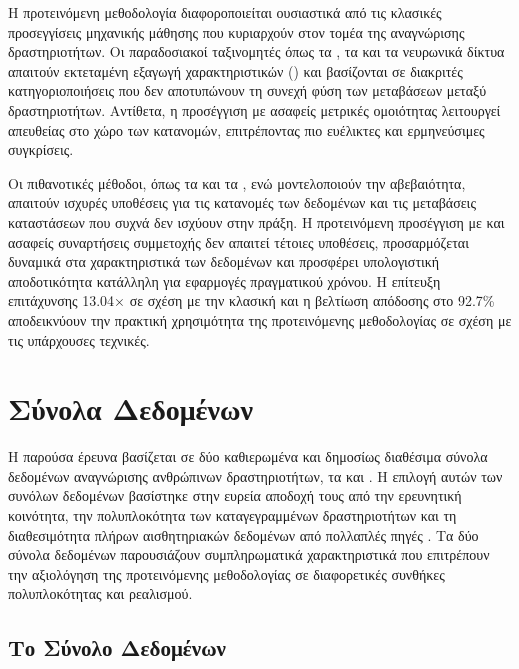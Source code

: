Η προτεινόμενη μεθοδολογία διαφοροποιείται ουσιαστικά από τις κλασικές προσεγγίσεις μηχανικής
μάθησης που κυριαρχούν στον τομέα της αναγνώρισης δραστηριοτήτων.
Οι παραδοσιακοί ταξινομητές όπως τα , τα  και τα νευρωνικά δίκτυα απαιτούν εκτεταμένη εξαγωγή χαρακτηριστικών () και βασίζονται σε διακριτές κατηγοριοποιήσεις που δεν αποτυπώνουν τη συνεχή
φύση των μεταβάσεων μεταξύ δραστηριοτήτων.
Αντίθετα, η προσέγγιση με ασαφείς μετρικές ομοιότητας λειτουργεί απευθείας στο χώρο των
κατανομών, επιτρέποντας πιο ευέλικτες και ερμηνεύσιμες συγκρίσεις.

Οι πιθανοτικές μέθοδοι, όπως τα  και τα , ενώ μοντελοποιούν την αβεβαιότητα, απαιτούν ισχυρές υποθέσεις για τις
κατανομές των δεδομένων και τις μεταβάσεις καταστάσεων που συχνά δεν ισχύουν στην πράξη.
Η προτεινόμενη προσέγγιση με  και ασαφείς συναρτήσεις συμμετοχής δεν απαιτεί
τέτοιες  υποθέσεις, προσαρμόζεται δυναμικά στα χαρακτηριστικά των δεδομένων και
προσφέρει υπολογιστική αποδοτικότητα κατάλληλη για εφαρμογές πραγματικού χρόνου.
Η επίτευξη επιτάχυνσης 13.04× σε σχέση με την κλασική  και η βελτίωση απόδοσης στο
92.7\%  αποδεικνύουν την πρακτική χρησιμότητα της προτεινόμενης μεθοδολογίας σε σχέση
με τις υπάρχουσες τεχνικές.


\section{Σύνολα Δεδομένων}
Η παρούσα έρευνα βασίζεται σε δύο καθιερωμένα και δημοσίως διαθέσιμα σύνολα δεδομένων αναγνώρισης ανθρώπινων δραστηριοτήτων, τα 
\cite{roggen2010,Chavarriaga2013} και  \cite{Reiss2012,Reiss2012creating}.
Η επιλογή αυτών των συνόλων δεδομένων βασίστηκε στην ευρεία αποδοχή τους από την ερευνητική κοινότητα, την πολυπλοκότητα των καταγεγραμμένων δραστηριοτήτων και τη διαθεσιμότητα πλήρων
αισθητηριακών δεδομένων από πολλαπλές πηγές \cite{Chen2012sensor}.
Τα δύο σύνολα δεδομένων παρουσιάζουν συμπληρωματικά χαρακτηριστικά που επιτρέπουν την αξιολόγηση της προτεινόμενης μεθοδολογίας σε διαφορετικές συνθήκες πολυπλοκότητας και ρεαλισμού.

\subsection{Το Σύνολο Δεδομένων }

